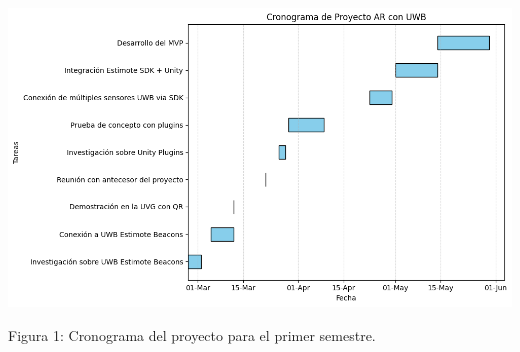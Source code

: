 \documentclass{article}
\begin{document}
\vspace{15mm} 
\includegraphics[width=1\textwidth]{images/cronograma.png}
{\begin{center}
    Figura 1: Cronograma del proyecto para el primer semestre.
\end{center}}
\newpage

    
 
\end{document}
